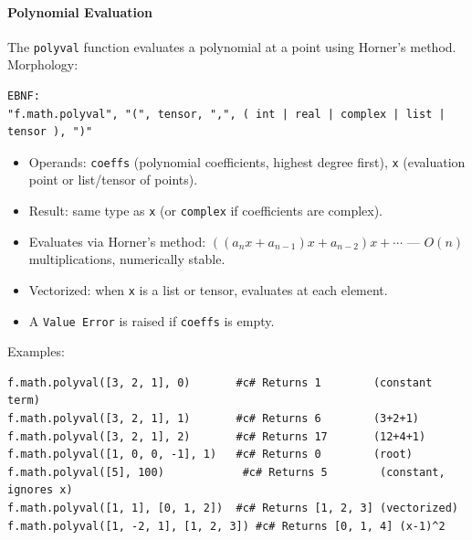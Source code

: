 \paragraph{Polynomial Evaluation}
The \texttt{polyval} function evaluates a polynomial at a point using Horner's method. \\ Morphology:
\begin{verbatim}
EBNF:
"f.math.polyval", "(", tensor, ",", ( int | real | complex | list | tensor ), ")"
\end{verbatim}
\begin{itemize}
\item Operands: \texttt{coeffs} (polynomial coefficients, highest degree first), \texttt{x} (evaluation point or list/tensor of points).
\item Result: same type as \texttt{x} (or \texttt{complex} if coefficients are complex).
\item Evaluates via Horner's method: $((a_n x + a_{n-1}) x + a_{n-2}) x + \cdots$ --- $O(n)$ multiplications, numerically stable.
\item Vectorized: when \texttt{x} is a list or tensor, evaluates at each element.
\item A \texttt{Value Error} is raised if \texttt{coeffs} is empty.
\end{itemize}
Examples:
\begin{verbatim}
f.math.polyval([3, 2, 1], 0)       #c# Returns 1        (constant term)
f.math.polyval([3, 2, 1], 1)       #c# Returns 6        (3+2+1)
f.math.polyval([3, 2, 1], 2)       #c# Returns 17       (12+4+1)
f.math.polyval([1, 0, 0, -1], 1)   #c# Returns 0        (root)
f.math.polyval([5], 100)            #c# Returns 5        (constant, ignores x)
f.math.polyval([1, 1], [0, 1, 2])  #c# Returns [1, 2, 3] (vectorized)
f.math.polyval([1, -2, 1], [1, 2, 3]) #c# Returns [0, 1, 4] (x-1)^2
\end{verbatim}

